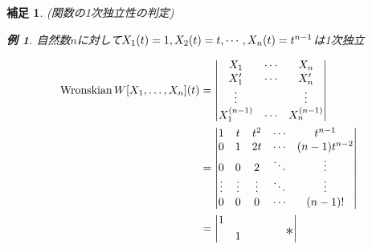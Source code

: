 \documentclass[autodetect-engine,dvipdfmx-if-dvi,ja=standard]{bxjsarticle}
\makeatletter
\theoremstyle{mystyle1}
\theoremstyle{mystyle2}
\newtheorem{example}{例}
\newtheorem{supple}{補足}
\renewenvironment{proof}[1][\proofname]{\par
  \pushQED{\qed}%
  \normalfont
  \topsep6\p@\@plus6\p@ \trivlist
  \item[\hskip\labelsep{\bfseries\sffamily #1}]\ignorespaces
}{%
  \popQED\endtrivlist\@endpefalse
}
\renewcommand\proofname{\ensuremath{\because}}
\makeatother
\begin{document}
\begin{supple}(関数の1次独立性の判定)
  \begin{example}
    自然数$n$に対して$X_1\qty(t)=1,X_2\qty(t)=t,\cdots,X_n\qty(t)=t^{n-1}$は1次独立
    \begin{proof}
      \begin{align*}
        \text{Wronskian}\,W\qty[X_1,\ldots,X_n]\qty(t) & =\mdet{
        X_1                                            & \cdots     & X_n                                                            \\
        X_1^\prime                                     & \cdots     & X_n^\prime                                                     \\
        \vdots                                         &            & \vdots                                                         \\
        X_1^{\qty(n-1)}                                & \cdots     & X_n^{\qty(n-1)}
        }                                                                                                                            \\
                                                       & =\mdet{
        1                                              & t          & t^2             & \cdots & t^{n-1}                             \\
        0                                              & 1          & 2t              & \cdots & \qty(n-1)t^{n-2}                    \\
        0                                              & 0          & 2               & \ddots & \vdots                              \\
        \vdots                                         & \vdots     & \vdots          & \ddots & \vdots                              \\
        0                                              & 0          & 0               & \cdots & \qty(n-1)!
        }                                                                                                                            \\
                                                       & =\mdet{
        1                                              &            &                 &        &                  &                  \\
                                                       & 1          &                 &        &                  & \text{\Large{*}} \\
}
\end{align*}
\end{proof}
\end{example}
\end{supple}
\end{document}
